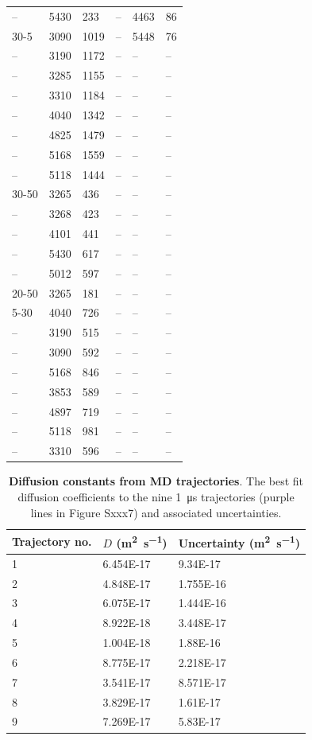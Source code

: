 \begin{xltabular}{\linewidth}{|Y|Y|Y|Y|Y|Y|}
-- & 5430 & 233 & -- & 4463 & 86 \\
30-5 & 3090 & 1019 & -- & 5448 & 76 \\
-- & 3190 & 1172 & -- & -- & -- \\
-- & 3285 & 1155 & -- & -- & -- \\
-- & 3310 & 1184 & -- & -- & -- \\
-- & 4040 & 1342 & -- & -- & -- \\
-- & 4825 & 1479 & -- & -- & -- \\
-- & 5168 & 1559 & -- & -- & -- \\
-- & 5118 & 1444 & -- & -- & -- \\
30-50 & 3265 & 436 & -- & -- & -- \\
-- & 3268 & 423 & -- & -- & -- \\
-- & 4101 & 441 & -- & -- & -- \\
-- & 5430 & 617 & -- & -- & -- \\
-- & 5012 & 597 & -- & -- & -- \\
20-50 & 3265 & 181 & -- & -- & -- \\
5-30 & 4040 & 726 & -- & -- & -- \\
-- & 3190 & 515 & -- & -- & -- \\
-- & 3090 & 592 & -- & -- & -- \\
-- & 5168 & 846 & -- & -- & -- \\
-- & 3853 & 589 & -- & -- & -- \\
-- & 4897 & 719 & -- & -- & -- \\
-- & 5118 & 981 & -- & -- & -- \\
-- & 3310 & 596 & -- & -- & -- \\
\hline
\end{xltabular}

\begin{table}
    \centering
    \caption{\textbf{Diffusion constants from MD trajectories}. The best fit diffusion coefficients to the nine \SI{1}{\micro\second} trajectories (purple lines in Figure Sxxx7) and associated uncertainties.}
    \begin{tabular}{|l|l|l|}
    \hline
    Trajectory no. & $D$ (\si{\meter\squared\per\second}) & Uncertainty  (\si{\meter\squared\per\second})  \\
    \hline
    1 &	6.454E-17	& 9.34E-17 \\
    2 &	4.848E-17	& 1.755E-16 \\
    3 &	6.075E-17	& 1.444E-16 \\
    4 &	8.922E-18	& 3.448E-17 \\
    5 &	1.004E-18	& 1.88E-16 \\
    6 &	8.775E-17	& 2.218E-17 \\
    7 &	3.541E-17	& 8.571E-17 \\
    8 &	3.829E-17	& 1.61E-17 \\
    9 &	7.269E-17	& 5.83E-17 \\
    \hline
    \end{tabular}
    \label{tab:wat_s2}
\end{table}

